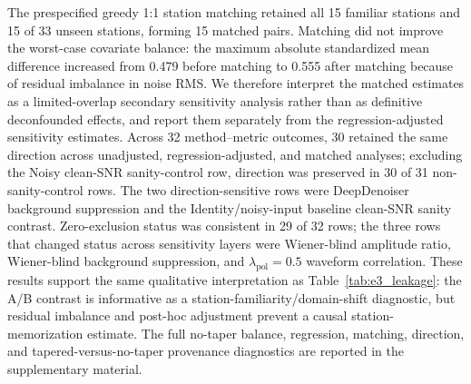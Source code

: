 \documentclass[review,12pt,authoryear]{elsarticle}
\newcommand{\lpol}{\lambda_{\mathrm{pol}}}
\begin{document}
The prespecified greedy 1:1 station matching retained all 15 familiar stations and 15 of 33 unseen stations, forming 15 matched pairs. Matching did not improve the worst-case covariate balance: the maximum absolute standardized mean difference increased from 0.479 before matching to 0.555 after matching because of residual imbalance in noise RMS. We therefore interpret the matched estimates as a limited-overlap secondary sensitivity analysis rather than as definitive deconfounded effects, and report them separately from the regression-adjusted sensitivity estimates. Across 32 method--metric outcomes, 30 retained the same direction across unadjusted, regression-adjusted, and matched analyses; excluding the Noisy clean-SNR sanity-control row, direction was preserved in 30 of 31 non-sanity-control rows. The two direction-sensitive rows were DeepDenoiser background suppression and the Identity/noisy-input baseline clean-SNR sanity contrast. Zero-exclusion status was consistent in 29 of 32 rows; the three rows that changed status across sensitivity layers were Wiener-blind amplitude ratio, Wiener-blind background suppression, and $\lpol=0.5$ waveform correlation. These results support the same qualitative interpretation as Table~\ref{tab:e3_leakage}: the A/B contrast is informative as a station-familiarity/domain-shift diagnostic, but residual imbalance and post-hoc adjustment prevent a causal station-memorization estimate. The full no-taper balance, regression, matching, direction, and tapered-versus-no-taper provenance diagnostics are reported in the supplementary material.
\end{document}
